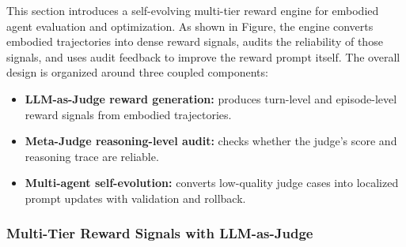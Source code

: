 This section introduces a self-evolving multi-tier reward engine for embodied agent evaluation and optimization. As shown in Figure, the engine converts embodied trajectories into dense reward signals, audits the reliability of those signals, and uses audit feedback to improve the reward prompt itself. The overall design is organized around three coupled components:
\begin{itemize}
    \item \textbf{LLM-as-Judge reward generation:} produces turn-level and episode-level reward signals from embodied trajectories.
    \item \textbf{Meta-Judge reasoning-level audit:} checks whether the judge's score and reasoning trace are reliable.
    \item \textbf{Multi-agent self-evolution:} converts low-quality judge cases into localized prompt updates with validation and rollback.
\end{itemize}


\subsubsection{Multi-Tier Reward Signals with LLM-as-Judge}
\label{subsec:multi_tier_reward}


